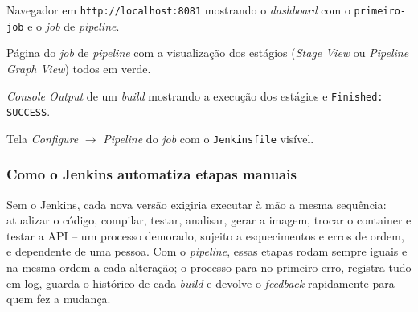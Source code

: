 
%
  {Navegador em \texttt{http://localhost:8081} mostrando o \textit{dashboard} com o
   \texttt{primeiro-job} e o \textit{job} de \textit{pipeline}.}

%
  {Página do \textit{job} de \textit{pipeline} com a visualização dos estágios
   (\textit{Stage View} ou \textit{Pipeline Graph View}) todos em verde.}

%
  {\textit{Console Output} de um \textit{build} mostrando a execução dos estágios e
   \texttt{Finished: SUCCESS}.}

%
  {Tela \textit{Configure} $\rightarrow$ \textit{Pipeline} do \textit{job} com o \texttt{Jenkinsfile}
   visível.}

\subsubsection{Como o Jenkins automatiza etapas manuais}

Sem o Jenkins, cada nova versão exigiria executar à mão a mesma sequência: atualizar o código,
compilar, testar, analisar, gerar a imagem, trocar o container e testar a API -- um processo demorado,
sujeito a esquecimentos e erros de ordem, e dependente de uma pessoa. Com o \textit{pipeline}, essas
etapas rodam sempre iguais e na mesma ordem a cada alteração; o processo para no primeiro erro,
registra tudo em log, guarda o histórico de cada \textit{build} e devolve o \textit{feedback}
rapidamente para quem fez a mudança.
